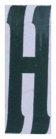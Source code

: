 \documentclass[a4paper]{article}
\begin{document}
\begin{enumerate}
\begin{enumerate}
\begin{figure}[H]
\begin{subfigure}[b]{.1\linewidth}
	            \includegraphics[width=\linewidth]{HW1-release/data/character_classification/new_images/4_H.jpg}
	        \end{subfigure}


\end{figure}
\end{enumerate}
\end{enumerate}
\end{document}
